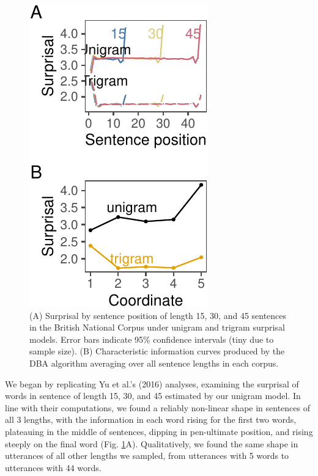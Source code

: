 \documentclass[
  english,
  man,floatsintext]{apa6}
\begin{document}
\begin{figure}[tb]

{\centering \includegraphics{figs/bncplots-1} 

}

\caption{(A) Surprisal by sentence position of length 15, 30, and 45 sentences in the British National Corpus under unigram and trigram surprisal models. Error bars indicate 95\% confidence intervals (tiny due to sample size). (B) Characteristic information curves produced by the DBA algorithm averaging over all sentence lengths in each corpus. }\label{fig:bncplots}
\end{figure}

We began by replicating Yu et al.'s (2016) analyses, examining the surprisal of words in sentence of length 15, 30, and 45 estimated by our unigram model. In line with their computations, we found a reliably non-linear shape in sentences of all 3 lengths, with the information in each word rising for the first two words, plateauing in the middle of sentences, dipping in pen-ultimate position, and rising steeply on the final word (Fig. \ref{fig:bncplots}A). Qualitatively, we found the same shape in utterances of all other lengths we sampled, from utterances with 5 words to utterances with 44 words.
\end{document}
